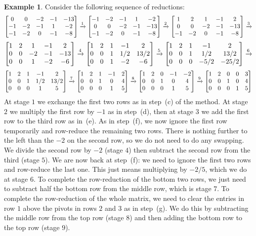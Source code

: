 \documentclass[reqno]{amsart}
\theoremstyle{definition}
\newtheorem{example}[theorem]{Example}
\begin{document}
\begin{example}\label{eg-rref-i}
 Consider the following sequence of reductions:
 \[
  \left[\begin{matrix}
   0 & 0 & -2 & -1 & -13 \\
  -1 & -2 & -1 & 1 & -2 \\
  -1 & -2 & 0 & -1 & -8
  \end{matrix}\right]  \xrightarrow{1}
  \left[\begin{matrix}
  -1 & -2 & -1 & 1 & -2 \\
   0 & 0 & -2 & -1 & -13 \\
  -1 & -2 & 0 & -1 & -8
  \end{matrix}\right]  \xrightarrow{2}
  \left[\begin{matrix}
   1 & 2 & 1 & -1 & 2 \\
   0 & 0 & -2 & -1 & -13 \\
  -1 & -2 & 0 & -1 & -8
  \end{matrix}\right]  \xrightarrow{3}
 \] \[
  \left[\begin{matrix}
   1 & 2 & 1 & -1 & 2 \\
   0 & 0 & -2 & -1 & -13 \\
   0 & 0 & 1 & -2 & -6
  \end{matrix}\right] \xrightarrow{4}
  \left[\begin{matrix}
   1 & 2 & 1 & -1 & 2 \\
   0 & 0 & 1 & 1/2 & 13/2 \\
   0 & 0 & 1 & -2 & -6
  \end{matrix}\right] \xrightarrow{5}
  \left[\begin{matrix}
   1 & 2 & 1 & -1 & 2 \\
   0 & 0 & 1 & 1/2 & 13/2 \\
   0 & 0 & 0 & -5/2 & -25/2
  \end{matrix}\right] \xrightarrow{6}
 \] \[
  \left[\begin{matrix}
   1 & 2 & 1 & -1 & 2 \\
   0 & 0 & 1 & 1/2 & 13/2 \\
   0 & 0 & 0 & 1 & 5
  \end{matrix}\right] \xrightarrow{7}
  \left[\begin{matrix}
   1 & 2 & 1 & -1 & 2 \\
   0 & 0 & 1 & 0 & 4 \\
   0 & 0 & 0 & 1 & 5
  \end{matrix}\right] \xrightarrow{8}
  \left[\begin{matrix}
   1 & 2 & 0 & -1 & -2 \\
   0 & 0 & 1 & 0 & 4 \\
   0 & 0 & 0 & 1 & 5
  \end{matrix}\right] \xrightarrow{9}
  \left[\begin{matrix}
   1 & 2 & 0 & 0 & 3 \\
   0 & 0 & 1 & 0 & 4 \\
   0 & 0 & 0 & 1 & 5
  \end{matrix}\right]
 \]
 At stage $1$ we exchange the first two rows as in step~(c) of the
 method.  At stage $2$ we multiply the first row by $-1$ as in step~(d), then
 at stage $3$ we add the first row to the third row as in~(e).  As in
 step~(f), we now ignore the first row temporarily and row-reduce the
 remaining two rows.  There is nothing further to the left than the
 $-2$ on the second row, so we do not need to do any swapping.  We
 divide the second row by $-2$ (stage $4$) then subtract the second row from
 the third (stage $5$).  We are now back at step~(f): we need to
 ignore the first two rows and row-reduce the last one.  This just
 means multiplying by $-2/5$, which we do at stage $6$.  To complete
 the row-reduction of the bottom two rows, we just need to subtract
 half the bottom row from the middle row, which is stage $7$.  To
 complete the row-reduction of the whole matrix, we need to clear the
 entries in row $1$ above the pivots in rows $2$ and $3$ as in
 step~(g).  We do this by subtracting the middle row from the top row
 (stage $8$) and then adding the bottom row to the top row (stage
 $9$).
\end{example}
\end{document}
